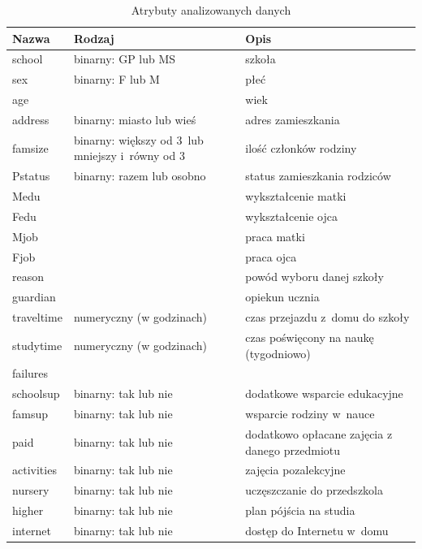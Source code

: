 \begin{table}[h!]
\centering
\caption{Atrybuty analizowanych danych}
\label{tab:attributes}
\begin{tabular}{|p{1.4cm}|p{3cm}|p{3cm}|}
\hline
Nazwa & Rodzaj & Opis \\ \hline
school   &     binarny: GP lub MS &   szkoła \\ \hline
sex   &   binarny: F lub M   &   płeć \\ \hline
age   &      &  wiek  \\ \hline
address   &   binarny: miasto lub wieś   &  adres zamieszkania  \\ \hline
famsize   &  binarny: większy od 3\ lub mniejszy i~równy od 3     &  ilość członków rodziny  \\ \hline
Pstatus   &  binarny: razem lub osobno    &  status zamieszkania rodziców  \\ \hline
Medu   &      &   wykształcenie matki \\ \hline
Fedu   &      &  wykształcenie ojca  \\ \hline
Mjob   &      &  praca matki  \\ \hline
Fjob   &      &  praca ojca  \\ \hline
reason   &      &   powód wyboru danej szkoły \\ \hline
guardian   &      &  opiekun ucznia  \\ \hline
traveltime   &   numeryczny (w godzinach)    &   czas przejazdu z~domu do szkoły    \\ \hline
studytime   &   numeryczny (w godzinach)   &  czas poświęcony na naukę (tygodniowo)  \\ \hline
failures   &      &    \\ \hline
schoolsup   &  binarny: tak lub nie  & dodatkowe wsparcie edukacyjne   \\ \hline
famsup   &   binarny: tak lub nie   &   wsparcie rodziny w~nauce \\ \hline
paid  &  binarny: tak lub nie    &  dodatkowo opłacane zajęcia z danego przedmiotu  \\ \hline
activities   &  binarny: tak lub nie  &  zajęcia pozalekcyjne    \\ \hline
nursery   &   binarny: tak lub nie   &   uczęszczanie do przedszkola \\ \hline
higher   &  binarny: tak lub nie   &  plan pójścia na studia  \\ \hline
internet   &   binarny: tak lub nie   &  dostęp do Internetu w~domu  \\ \hline

\end{tabular}
\end{table}
